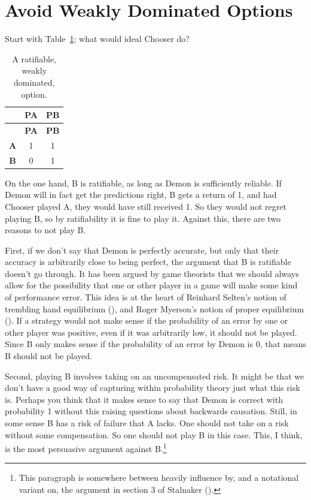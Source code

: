 \documentclass[
  12pt,
  letterpaper,
  DIV=11,
  numbers=noendperiod]{scrreprt}
\begin{document}
\section{Avoid Weakly Dominated Options}\label{sec-weak-avoid}

Start with Table~\ref{tbl-first-wd}; what would ideal Chooser do?

\begin{longtable}[]{@{}ccc@{}}
\caption{A ratifiable, weakly dominated,
option.}\label{tbl-first-wd}\tabularnewline
\toprule\noalign{}
& \textbf{PA} & \textbf{PB} \\
\midrule\noalign{}
\endfirsthead
\toprule\noalign{}
& \textbf{PA} & \textbf{PB} \\
\midrule\noalign{}
\endhead
\bottomrule\noalign{}
\endlastfoot
\textbf{A} & 1 & 1 \\
\textbf{B} & 0 & 1 \\
\end{longtable}

On the one hand, B is ratifiable, as long as Demon is sufficiently
reliable. If Demon will in fact get the predictions right, B gets a
return of 1, and had Chooser played A, they would have still received 1.
So they would not regret playing B, so by ratifiability it is fine to
play it. Against this, there are two reasons to not play B.

First, if we don't say that Demon is perfectly accurate, but only that
their accuracy is arbitrarily close to being perfect, the argument that
B is ratifiable doesn't go through. It has been argued by game theorists
that we should always allow for the possibility that one or other player
in a game will make some kind of performance error. This idea is at the
heart of Reinhard Selten's notion of trembling hand equilibrium
(), and Roger Myerson's notion of
proper equilibrium (). If a
strategy would not make sense if the probability of an error by one or
other player was positive, even if it was arbitrarily low, it should not
be played. Since B only makes sense if the probability of an error by
Demon is 0, that means B should not be played.

Second, playing B involves taking on an uncompensated risk. It might be
that we don't have a good way of capturing within probability theory
just what this risk is. Perhaps you think that it makes sense to say
that Demon is correct with probability 1 without this raising questions
about backwards causation. Still, in some sense B has a risk of failure
that A lacks. One should not take on a risk without some compensation.
So one should not play B in this case. This, I think, is the most
persuasive argument against B.\footnote{This paragraph is somewhere
  between heavily influence by, and a notational variant on, the
  argument in section 3 of Stalnaker
  ().}
\end{document}
